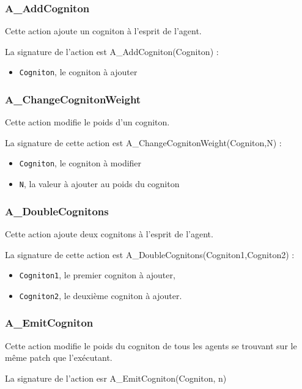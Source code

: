 	\subsubsection{A\_AddCogniton}
	Cette action ajoute un cogniton à l'esprit de l'agent. 
	
	La signature de l'action est A\_AddCogniton(Cogniton) :
	
	\begin{itemize}
	\item \texttt{Cogniton},  le cogniton à ajouter
	\end{itemize}
	
	\subsubsection{A\_ChangeCognitonWeight}
	Cette action modifie le poids d'un cogniton. 
	
	La signature de cette action est  A\_ChangeCognitonWeight(Cogniton,N) :
	
	\begin{itemize}
	\item \texttt{Cogniton}, le cogniton à modifier
	\item \texttt{N}, la valeur à ajouter au poids du cogniton
	\end{itemize}
	
	\subsubsection{A\_DoubleCognitons}
	
	Cette action ajoute deux cognitons à l'esprit de l'agent. 
	
	La signature de cette action est A\_DoubleCognitons(Cogniton1,Cogniton2) :
	
	\begin{itemize}
	\item \texttt{Cogniton1}, le premier cogniton à ajouter,
	\item \texttt{Cogniton2}, le deuxième cogniton à ajouter.
	\end{itemize}
	
	\subsubsection{A\_EmitCogniton}
	
	Cette action modifie le poids du cogniton de tous les agents se trouvant sur le même patch que l'exécutant.  
	
	La signature de l'action esr  A\_EmitCogniton(Cogniton, n)
	
